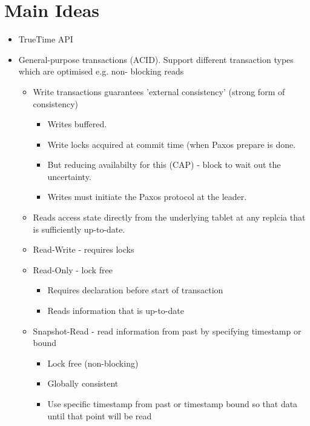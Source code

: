 \section{Main Ideas}
\begin{itemize}
    
    \item TrueTime API

    \item General-purpose transactions (ACID). Support different transaction types which are optimised e.g. non- blocking reads
    \begin{itemize}
        \item Write transactions guarantees 'external consistency' (strong form of consistency)
        \begin{itemize}
            \item Writes buffered. 
            \item Write locks acquired at commit time (when Paxos prepare is done. 
            \item But reducing availabilty for this (CAP) - block to wait out the uncertainty.
            \item Writes must initiate the Paxos protocol at the leader.
        \end{itemize}
        \item Reads access state directly from the underlying tablet at any replcia that is sufficiently up-to-date.
        \item Read-Write - requires locks
        \item Read-Only - lock free
        \begin{itemize} 
            \item Requires declaration before start of transaction
            \item Reads information that is up-to-date
        \end{itemize}
        \item Snapshot-Read - read information from past by specifying timestamp or bound
        \begin{itemize}
            \item Lock free (non-blocking)
            \item Globally consistent
            \item Use specific timestamp from past or timestamp bound so that data until that point will be read
        \end{itemize}
    \end{itemize}


\end{itemize}
